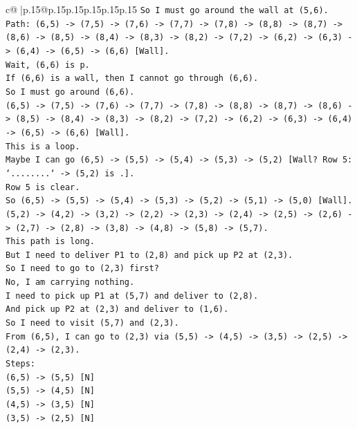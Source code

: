 \documentclass{article}
\begin{document}
{\begin{supertabular}{c@{$\;$}|p{.15\linewidth}@{}p{.15\linewidth}p{.15\linewidth}p{.15\linewidth}p{.15\linewidth}p{.15\linewidth}}
{{{\texttt{So I must go around the wall at (5,6).} \\
\texttt{Path: (6,5) {-}> (7,5) {-}> (7,6) {-}> (7,7) {-}> (7,8) {-}> (8,8) {-}> (8,7) {-}> (8,6) {-}> (8,5) {-}> (8,4) {-}> (8,3) {-}> (8,2) {-}> (7,2) {-}> (6,2) {-}> (6,3) {-}> (6,4) {-}> (6,5) {-}> (6,6) {[}Wall{]}.} \\
\texttt{Wait, (6,6) is p.} \\
\texttt{If (6,6) is a wall, then I cannot go through (6,6).} \\
\texttt{So I must go around (6,6).} \\
\texttt{(6,5) {-}> (7,5) {-}> (7,6) {-}> (7,7) {-}> (7,8) {-}> (8,8) {-}> (8,7) {-}> (8,6) {-}> (8,5) {-}> (8,4) {-}> (8,3) {-}> (8,2) {-}> (7,2) {-}> (6,2) {-}> (6,3) {-}> (6,4) {-}> (6,5) {-}> (6,6) {[}Wall{]}.} \\
\texttt{This is a loop.} \\
\texttt{Maybe I can go (6,5) {-}> (5,5) {-}> (5,4) {-}> (5,3) {-}> (5,2) {[}Wall? Row 5: `........` {-}> (5,2) is .{]}.} \\
\texttt{Row 5 is clear.} \\
\texttt{So (6,5) {-}> (5,5) {-}> (5,4) {-}> (5,3) {-}> (5,2) {-}> (5,1) {-}> (5,0) {[}Wall{]}.} \\
\texttt{(5,2) {-}> (4,2) {-}> (3,2) {-}> (2,2) {-}> (2,3) {-}> (2,4) {-}> (2,5) {-}> (2,6) {-}> (2,7) {-}> (2,8) {-}> (3,8) {-}> (4,8) {-}> (5,8) {-}> (5,7).} \\
\texttt{This path is long.} \\
\texttt{But I need to deliver P1 to (2,8) and pick up P2 at (2,3).} \\
\texttt{So I need to go to (2,3) first?} \\
\texttt{No, I am carrying nothing.} \\
\texttt{I need to pick up P1 at (5,7) and deliver to (2,8).} \\
\texttt{And pick up P2 at (2,3) and deliver to (1,6).} \\
\texttt{So I need to visit (5,7) and (2,3).} \\
\texttt{From (6,5), I can go to (2,3) via (5,5) {-}> (4,5) {-}> (3,5) {-}> (2,5) {-}> (2,4) {-}> (2,3).} \\
\texttt{Steps:} \\
\texttt{(6,5) {-}> (5,5) {[}N{]}} \\
\texttt{(5,5) {-}> (4,5) {[}N{]}} \\
\texttt{(4,5) {-}> (3,5) {[}N{]}} \\
\texttt{(3,5) {-}> (2,5) {[}N{]}} \\
}}}
\end{supertabular}}
\end{document}
